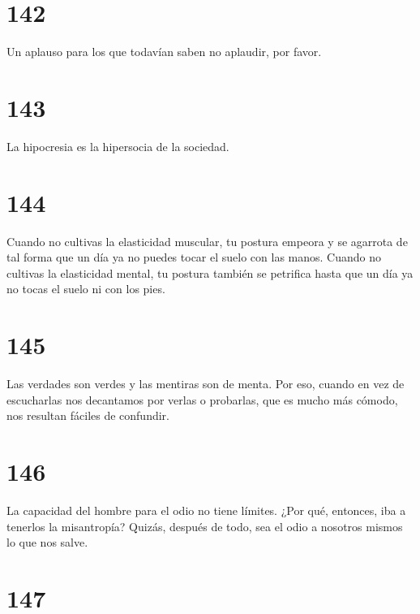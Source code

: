 \documentclass[a4paper,11pt,openright,twocolumn]{book}
\begin{document}
\section*{142}

Un aplauso para los que todavían saben no aplaudir, por favor.

\section*{143}

La hipocresia es la hipersocia de la sociedad. 

\section*{144}

Cuando no cultivas la elasticidad muscular, tu postura empeora y se agarrota de tal forma que un día ya no
puedes tocar el suelo con las manos. Cuando no cultivas la elasticidad mental, tu postura también se petrifica
 hasta que un día ya no tocas el suelo ni con los pies. 

\section*{145}

Las verdades son verdes y las mentiras son de menta. Por eso, cuando en vez de escucharlas nos decantamos
por verlas o probarlas, que es mucho más cómodo, nos resultan fáciles de confundir.

\section*{146}

La capacidad del hombre para el odio no tiene límites. ¿Por qué, entonces, iba a tenerlos la misantropía?
Quizás, después de todo, sea el odio a nosotros mismos lo que nos salve. 

\section*{147}
\end{document}
